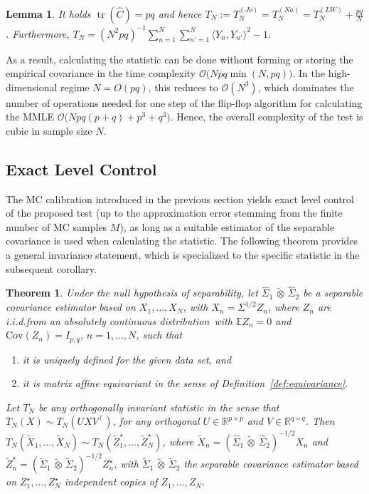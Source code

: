\documentclass[12pt]{article}
\newcommand{\E}{\mathbb{E}}
\newcommand{\R}{\mathbb{R}}
\newcommand{\cov}{\mathrm{Cov}}
\newcommand{\tr}{\operatorname{tr}}
\newcommand{\ot}{\,\tilde\otimes\,}
\newcommand{\mmle}{\widehat \Sigma_1 \ot \widehat \Sigma_2}
\newtheorem{theorem}{Theorem}
\newtheorem{lemma}{Lemma}
\begin{document}
\begin{lemma}\label{lem:statistics_equal}
    It holds $\tr(\widehat{C})=pq$ and hence $T_N:=T_N^{(Jo)}=T_N^{(Na)}=T_N^{(LW)}+\frac{pq}{N}$. Furthermore, $T_N=(N^2pq)^{-1} \sum_{n=1}^N \sum_{n'=1}^N \langle Y_n, Y_{n'} \rangle^2 - 1$.
\end{lemma}

As a result, calculating the statistic can be done without forming or storing the empirical covariance in the time complexity $\mathcal{O}\big(Npq\min(N,pq)\big)$. In the high-dimensional regime  $N=O(pq)$, this reduces to $\mathcal{O}(N^3)$, which dominates the number of operations needed for one step of the flip-flop algorithm for calculating the MMLE $\mathcal{O}\big(Npq(p+q)+p^3+q^3\big)$. Hence, the overall complexity of the test is cubic in sample size $N$.

\newpage
\subsection{Exact Level Control}

The MC calibration introduced in the previous section yields exact level control of the proposed test (up to the approximation error stemming from the finite number of MC samples $M$), as long as a suitable estimator of the separable covariance is used when calculating the statistic. The following theorem provides a general invariance statement, which is specialized to the specific statistic in the subsequent corollary.

\begin{theorem}\label{thm:law}
Under the null hypothesis of separability, let $\widehat{\Sigma}_1 \ot \widehat{\Sigma}_2$ be a separable covariance estimator based on $X_1,\ldots,X_N$, with $X_n=\Sigma^{1/2}Z_n$,
where $Z_n$ are i.i.d.from an absolutely continuous distribution~with $\E Z_n=0$ and $\cov(Z_n) = I_{p,q}$, $n=1,\ldots,N$, such that
\begin{enumerate}
    \item it is uniquely defined for the given data set, and
    \item it is matrix affine equivariant in the sense of Definition~\ref{def:equivariance}.
\end{enumerate}
Let $T_N$ be any orthogonally invariant statistic in the sense that $T_N(X)\sim T_N(UXV^\top)$, for any orthogonal $U\in\R^{p\times p}$ and $V\in\R^{q\times q}$.  
Then $T_N(\widetilde X_1,\ldots,\widetilde X_N) \sim T_N(\widetilde Z_1^\star,\ldots,\widetilde Z_N^\star)$, where $\widetilde X_n=(\mmle)^{-1/2} X_n$ and $\widetilde Z_n^\star=(\widetilde\Sigma_1\ot\widetilde\Sigma_2)^{-1/2} Z_n^\star$, with $\widetilde\Sigma_1\ot\widetilde\Sigma_2$ the separable covariance estimator based on $Z_1^\star,\ldots,Z_N^\star$ independent copies of $Z_1,\ldots,Z_N$.
\end{theorem}
\end{document}
